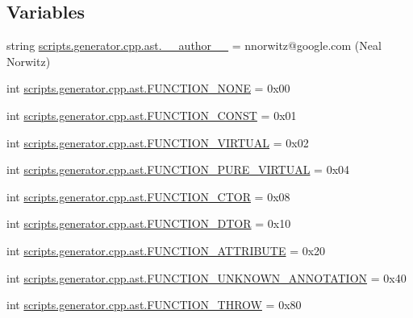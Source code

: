 \subsection*{Variables}
\begin{DoxyCompactItemize}
\item 
string \mbox{\hyperlink{namespacescripts_1_1generator_1_1cpp_1_1ast_af0713a07a9b249c2ad38d4af77d35a49}{scripts.\+generator.\+cpp.\+ast.\+\_\+\+\_\+author\+\_\+\+\_\+}} = \textquotesingle{}nnorwitz@google.\+com (Neal Norwitz)\textquotesingle{}
\item 
int \mbox{\hyperlink{namespacescripts_1_1generator_1_1cpp_1_1ast_a8a58f55510f9049e4ec9e2c218f169dd}{scripts.\+generator.\+cpp.\+ast.\+F\+U\+N\+C\+T\+I\+O\+N\+\_\+\+N\+O\+NE}} = 0x00
\item 
int \mbox{\hyperlink{namespacescripts_1_1generator_1_1cpp_1_1ast_a7b6e0d15086ba568a08a3669a5fa0ebf}{scripts.\+generator.\+cpp.\+ast.\+F\+U\+N\+C\+T\+I\+O\+N\+\_\+\+C\+O\+N\+ST}} = 0x01
\item 
int \mbox{\hyperlink{namespacescripts_1_1generator_1_1cpp_1_1ast_afff4eac003067e79aedbcb26445129ea}{scripts.\+generator.\+cpp.\+ast.\+F\+U\+N\+C\+T\+I\+O\+N\+\_\+\+V\+I\+R\+T\+U\+AL}} = 0x02
\item 
int \mbox{\hyperlink{namespacescripts_1_1generator_1_1cpp_1_1ast_a2e1b8ca7e793a1cf78cac34fbf40a63a}{scripts.\+generator.\+cpp.\+ast.\+F\+U\+N\+C\+T\+I\+O\+N\+\_\+\+P\+U\+R\+E\+\_\+\+V\+I\+R\+T\+U\+AL}} = 0x04
\item 
int \mbox{\hyperlink{namespacescripts_1_1generator_1_1cpp_1_1ast_aae137797b47fc285fc557204ee7a4869}{scripts.\+generator.\+cpp.\+ast.\+F\+U\+N\+C\+T\+I\+O\+N\+\_\+\+C\+T\+OR}} = 0x08
\item 
int \mbox{\hyperlink{namespacescripts_1_1generator_1_1cpp_1_1ast_a66f5e656ae99d53ef4eaab09c3c65da3}{scripts.\+generator.\+cpp.\+ast.\+F\+U\+N\+C\+T\+I\+O\+N\+\_\+\+D\+T\+OR}} = 0x10
\item 
int \mbox{\hyperlink{namespacescripts_1_1generator_1_1cpp_1_1ast_a75cda02d05ba46cf8e9aba34c88a2994}{scripts.\+generator.\+cpp.\+ast.\+F\+U\+N\+C\+T\+I\+O\+N\+\_\+\+A\+T\+T\+R\+I\+B\+U\+TE}} = 0x20
\item 
int \mbox{\hyperlink{namespacescripts_1_1generator_1_1cpp_1_1ast_ac7a4794f0f701f085266a0f68bf20ea1}{scripts.\+generator.\+cpp.\+ast.\+F\+U\+N\+C\+T\+I\+O\+N\+\_\+\+U\+N\+K\+N\+O\+W\+N\+\_\+\+A\+N\+N\+O\+T\+A\+T\+I\+ON}} = 0x40
\item 
int \mbox{\hyperlink{namespacescripts_1_1generator_1_1cpp_1_1ast_aef0665a8f77d549e2221df3f00bffaf0}{scripts.\+generator.\+cpp.\+ast.\+F\+U\+N\+C\+T\+I\+O\+N\+\_\+\+T\+H\+R\+OW}} = 0x80

\end{DoxyCompactItemize}
